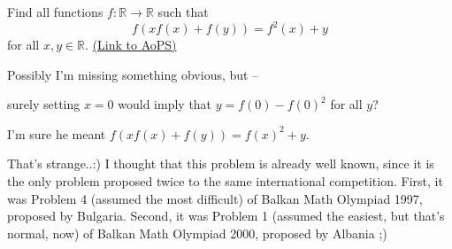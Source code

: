 \begin{problem}
	Find all functions $f: \mathbb R \to \mathbb R$ such that \[ f( xf(x) + f(y) ) = f^2(x) + y \] for all $x,y\in \mathbb R$.
	\flushright \href{https://artofproblemsolving.com/community/c6h56415}{(Link to AoPS)}
\end{problem}



\begin{solution}
	Possibly I'm missing something obvious, but -- 

surely setting $x=0$ would imply that $y=f(0)-f(0)^2$ for all $y$?
\end{solution}



\begin{solution}
	I'm sure he meant $f(xf(x) + f(y)) = f(x)^2 + y$.
\end{solution}



\begin{solution}
	That's strange..:) I thought that this problem is already well known, since it is the only problem proposed twice to the same international competition. First, it was Problem 4 (assumed the most difficult) of Balkan Math Olympiad 1997, proposed by Bulgaria. Second, it was Problem 1 (assumed the easiest, but that's normal, now) of Balkan Math Olympiad 2000, proposed by Albania ;)
\end{solution}



